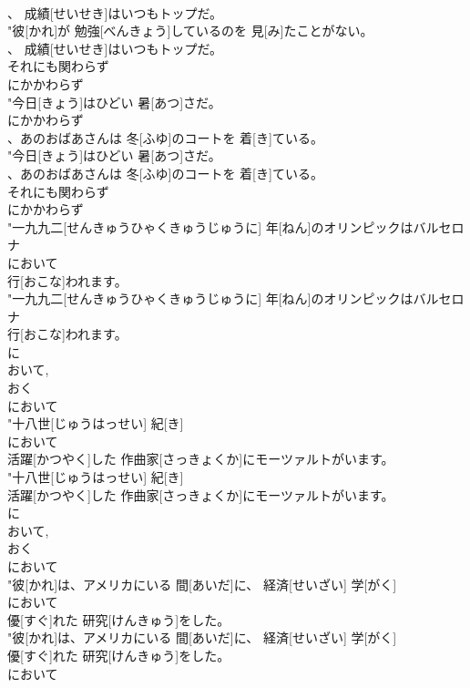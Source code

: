 \documentclass[8pt]{extreport}
\begin{document}
\begin{CJK}{UTF8}{min}
\\	、 成績[せいせき]はいつもトップだ。
\\	"彼[かれ]が 勉強[べんきょう]しているのを 見[み]たことがない。
\\	、 成績[せいせき]はいつもトップだ。
\\	それにも関わらず 
\\	にかかわらず
\\	"今日[きょう]はひどい 暑[あつ]さだ。
\\	にかかわらず
\\	、あのおばあさんは 冬[ふゆ]のコートを 着[き]ている。
\\	"今日[きょう]はひどい 暑[あつ]さだ。
\\	、あのおばあさんは 冬[ふゆ]のコートを 着[き]ている。
\\	それにも関わらず 
\\	にかかわらず
\\	"一九九二[せんきゅうひゃくきゅうじゅうに] 年[ねん]のオリンピックはバルセロナ
\\	において
\\	行[おこな]われます。
\\	"一九九二[せんきゅうひゃくきゅうじゅうに] 年[ねん]のオリンピックはバルセロナ
\\	行[おこな]われます。
\\	に 
\\	おいて, 
\\	おく 
\\	において
\\	"十八世[じゅうはっせい] 紀[き]
\\	において
\\	活躍[かつやく]した 作曲家[さっきょくか]にモーツァルトがいます。
\\	"十八世[じゅうはっせい] 紀[き]
\\	活躍[かつやく]した 作曲家[さっきょくか]にモーツァルトがいます。
\\	に 
\\	おいて, 
\\	おく 
\\	において
\\	"彼[かれ]は、アメリカにいる 間[あいだ]に、 経済[せいざい] 学[がく]
\\	において
\\	優[すぐ]れた 研究[けんきゅう]をした。
\\	"彼[かれ]は、アメリカにいる 間[あいだ]に、 経済[せいざい] 学[がく]
\\	優[すぐ]れた 研究[けんきゅう]をした。
\\	において

\end{CJK}
\end{document}
